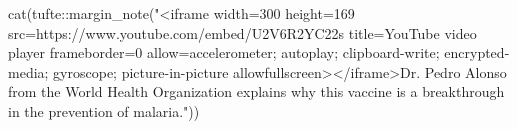 \documentclass[
  letterpaper,
  DIV=11,
  numbers=noendperiod,
  oneside]{scrartcl}
\newenvironment{Shaded}{\begin{snugshade}}{\end{snugshade}}
\newcommand{\FunctionTok}[1]{\textcolor[rgb]{0.28,0.35,0.67}{#1}}
\newcommand{\NormalTok}[1]{\textcolor[rgb]{0.00,0.23,0.31}{#1}}
\newcommand{\SpecialCharTok}[1]{\textcolor[rgb]{0.37,0.37,0.37}{#1}}
\newcommand{\StringTok}[1]{\textcolor[rgb]{0.13,0.47,0.30}{#1}}
\begin{document}
\begin{Shaded}
\begin{Highlighting}[]
\FunctionTok{cat}\NormalTok{(tufte}\SpecialCharTok{::}\FunctionTok{margin\_note}\NormalTok{(}\StringTok{"\textless{}iframe width=\textquotesingle{}300\textquotesingle{} height=\textquotesingle{}169\textquotesingle{} src=\textquotesingle{}https://www.youtube.com/embed/U2V6R2YC22s\textquotesingle{} title=\textquotesingle{}YouTube video player\textquotesingle{} frameborder=\textquotesingle{}0\textquotesingle{} allow=\textquotesingle{}accelerometer; autoplay; clipboard{-}write; encrypted{-}media; gyroscope; picture{-}in{-}picture\textquotesingle{} allowfullscreen\textgreater{}\textless{}/iframe\textgreater{}Dr. Pedro Alonso from the World Health Organization explains why this vaccine is a breakthrough in the prevention of malaria."}\NormalTok{))}
\end{Highlighting}
\end{Shaded}
\end{document}
